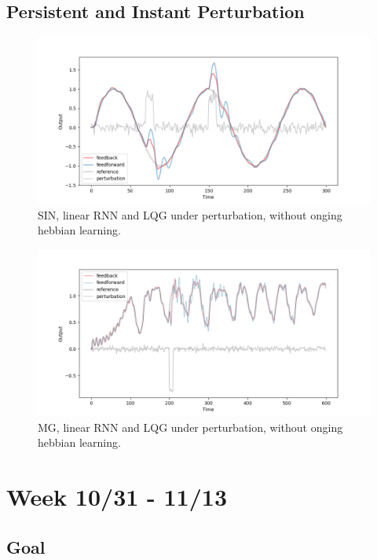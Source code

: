 \documentclass[12pt, a4paper]{article}
\begin{document}
\subsection*{Persistent and Instant Perturbation}

\begin{figure}[H]
    \centering
    \includegraphics[width=\textwidth]{baseline_linear/fig/SIN_lin_noise.png}
    \caption{SIN, linear RNN and LQG under perturbation, without onging hebbian learning.}
\end{figure}

\begin{figure}[H]
    \centering
    \includegraphics[width=\textwidth]{baseline_linear/fig/MG_lin_noise.png}
    \caption{MG, linear RNN and LQG under perturbation, without onging hebbian learning.}
\end{figure}


\newpage


\section*{Week 10/31 - 11/13}

\subsection*{Goal}
\end{document}
